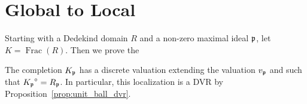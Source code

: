 \section{Global to Local}
Starting with a Dedekind domain $R$ and a non-zero maximal ideal $\mathfrak{p}$, let $K=\operatorname{Frac}(R)$. Then we prove the
\begin{proposition}
	\label{prop:extension_equal}
	The completion $K_{\mathfrak{p}}$ has a discrete valuation extending the valuation $v_{\mathfrak{p}}$ and such that ${K_{\mathfrak{p}}}^\circ=R_{\mathfrak{p}}$. In particular, this localization is a DVR by Proposition~\ref{prop:unit_ball_dvr}.
\end{proposition}



